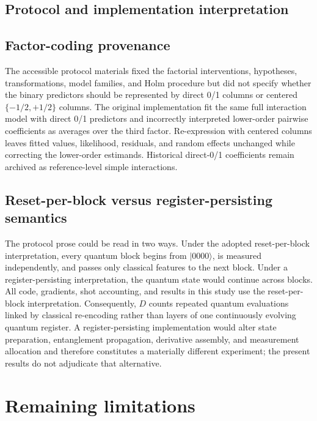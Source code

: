 \documentclass[pdflatex,sn-basic,Numbered]{sn-jnl}
\begin{document}
\begin{appendices}
\section{Protocol and implementation interpretation}

\subsection{Factor-coding provenance}

The accessible protocol materials fixed the factorial interventions, hypotheses, transformations, model families, and Holm procedure but did not specify whether the binary predictors should be represented by direct 0/1 columns or centered $\{-1/2,+1/2\}$ columns. The original implementation fit the same full interaction model with direct 0/1 predictors and incorrectly interpreted lower-order pairwise coefficients as averages over the third factor. Re-expression with centered columns leaves fitted values, likelihood, residuals, and random effects unchanged while correcting the lower-order estimands. Historical direct-0/1 coefficients remain archived as reference-level simple interactions.

\subsection{Reset-per-block versus register-persisting semantics}

The protocol prose could be read in two ways. Under the adopted reset-per-block interpretation, every quantum block begins from $\lvert0000\rangle$, is measured independently, and passes only classical features to the next block. Under a register-persisting interpretation, the quantum state would continue across blocks. All code, gradients, shot accounting, and results in this study use the reset-per-block interpretation. Consequently, $D$ counts repeated quantum evaluations linked by classical re-encoding rather than layers of one continuously evolving quantum register. A register-persisting implementation would alter state preparation, entanglement propagation, derivative assembly, and measurement allocation and therefore constitutes a materially different experiment; the present results do not adjudicate that alternative.
\end{appendices}

\section{Remaining limitations}
\end{document}
